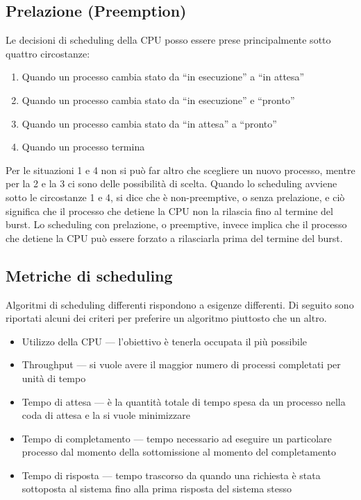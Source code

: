 \documentclass[a4paper]{article}
\begin{document}
\subsection{Prelazione (Preemption)}
Le decisioni di scheduling della CPU posso essere prese principalmente sotto quattro circostanze:
\begin{enumerate}
    \item Quando un processo cambia stato da ``in esecuzione'' a ``in attesa''
    \item Quando un processo cambia stato da ``in esecuzione'' e ``pronto''
    \item Quando un processo cambia stato da ``in attesa'' a ``pronto''
    \item Quando un processo termina
\end{enumerate}
Per le situazioni 1 e 4 non si può far altro che scegliere un nuovo processo, mentre per la 2 e la 3 ci sono delle possibilità di scelta.
Quando lo scheduling avviene sotto le circostanze 1 e 4, si dice che è non-preemptive, o senza prelazione, e ciò significa che il processo che detiene la CPU non la rilascia fino al termine del burst. \newline
Lo scheduling con prelazione, o preemptive, invece implica che il processo che detiene la CPU può essere forzato a rilasciarla prima del termine del burst.

\subsection{Metriche di scheduling}
Algoritmi di scheduling differenti rispondono a esigenze differenti. Di seguito sono riportati alcuni dei criteri per preferire un algoritmo piuttosto che un altro.
\begin{itemize}
    \item Utilizzo della CPU --- l'obiettivo è tenerla occupata il più possibile
    \item Throughput --- si vuole avere il maggior numero di processi completati per unità di tempo
    \item Tempo di attesa --- è la quantità totale di tempo spesa da un processo nella coda di attesa e la si vuole minimizzare
    \item Tempo di completamento --- tempo necessario ad eseguire un particolare processo dal momento della sottomissione al momento del completamento
    \item Tempo di risposta --- tempo trascorso da quando una richiesta è stata sottoposta al sistema fino alla prima risposta del sistema stesso
\end{itemize}
\end{document}

